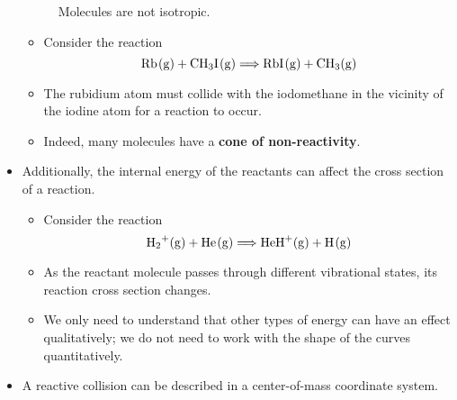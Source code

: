 \documentclass[../notes.tex]{subfiles}
\begin{document}
\begin{itemize}
\begin{figure}[h!]
        \caption{Molecules are not isotropic.}
        \label{fig:noIsotropy}
    \end{figure}
    \begin{itemize}
        \item Consider the reaction
        \begin{equation*}
            \ce{Rb(g) + CH3I(g)} \Longrightarrow \ce{RbI(g) + CH3(g)}
        \end{equation*}
        \item The rubidium atom must collide with the iodomethane in the vicinity of the iodine atom for a reaction to occur.
        \item Indeed, many molecules have a \textbf{cone of non-reactivity}.
    \end{itemize}
    \item Additionally, the internal energy of the reactants can affect the cross section of a reaction.
    \begin{itemize}
        \item Consider the reaction
        \begin{equation*}
            \ce{H2+(g) + He(g)} \Longrightarrow \ce{HeH+(g) + H(g)}
        \end{equation*}
        \item As the reactant molecule  passes through different vibrational states, its reaction cross section changes.
        \item We only need to understand that other types of energy can have an effect qualitatively; we do not need to work with the shape of the curves quantitatively.
    \end{itemize}
    \item A reactive collision can be described in a center-of-mass coordinate system.
    \begin{figure}[h!]
        \centering
\end{figure}
\end{itemize}
\end{document}

